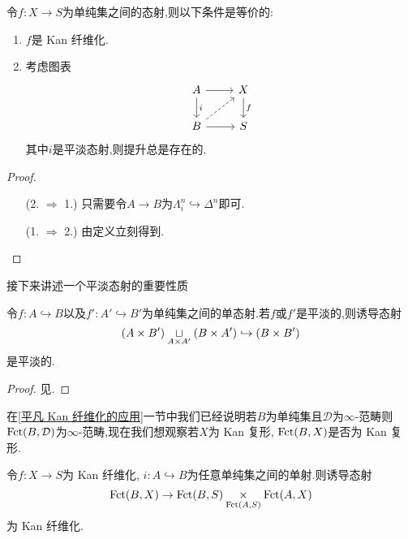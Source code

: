 \begin{proposition}\label{命题: Kan 纤维化与平淡态射提升}
    令$f: X \to S$为单纯集之间的态射,则以下条件是等价的:
    \begin{enumerate}
        \item $f$是 Kan 纤维化.
        \item 考虑图表
        \[\begin{tikzcd}
	A & X \\
	B & S
	\arrow[from=1-1, to=1-2]
	\arrow["i", from=1-1, to=2-1]
	\arrow["f", from=1-2, to=2-2]
	\arrow[dashed, from=2-1, to=1-2]
	\arrow[from=2-1, to=2-2]
        \end{tikzcd}\]
        其中$i$是平淡态射,则提升总是存在的.
    \end{enumerate}
\end{proposition}
\begin{proof}
    \begin{enumerate}
        \item[(2. $\Rightarrow$ 1.)]只需要令$A \to B$为$\Lambda_i^n \hookrightarrow \Delta^n$即可.
        \item[(1. $\Rightarrow$ 2.)]由定义立刻得到.
    \end{enumerate}
\end{proof}
接下来讲述一个平淡态射的重要性质
\begin{proposition}\label{命题:平淡诱导平淡无交并}
    令$f: A \hookrightarrow B$以及$f' : A' \hookrightarrow B'$为单纯集之间的单态射.若$f$或$f'$是平淡的,则诱导态射
    \[
        (A\times B')\underset{A \times A'}{\sqcup} (B\times A') \hookrightarrow (B\times B')
    \]
    是平淡的.
\end{proposition}
\begin{proof}
    见\parencite[\href{https://kerodon.net/tag/014D}{014D}]{Kerodon}.
\end{proof}
在\ref{平凡 Kan 纤维化的应用}一节中我们已经说明若$B$为单纯集且$\mathcal{D}$为$\infty$-范畴则$\operatorname{Fct}(B,\mathcal{D})$为$\infty$-范畴,现在我们想观察若$X$为 Kan 复形, $\operatorname{Fct}(B,X)$是否为 Kan 复形.
\begin{theorem}\label{定理:态射空间纤维积与 Kan 纤维化}
    令$f: X \to S$为 Kan 纤维化, $i : A \hookrightarrow B$为任意单纯集之间的单射.则诱导态射
    \[
        \operatorname{Fct}(B,X) \to \operatorname{Fct}(B,S) \underset{\operatorname{Fct}(A,S)}{\times}\operatorname{Fct}(A,X)
    \]
    为 Kan 纤维化.
\end{theorem}

